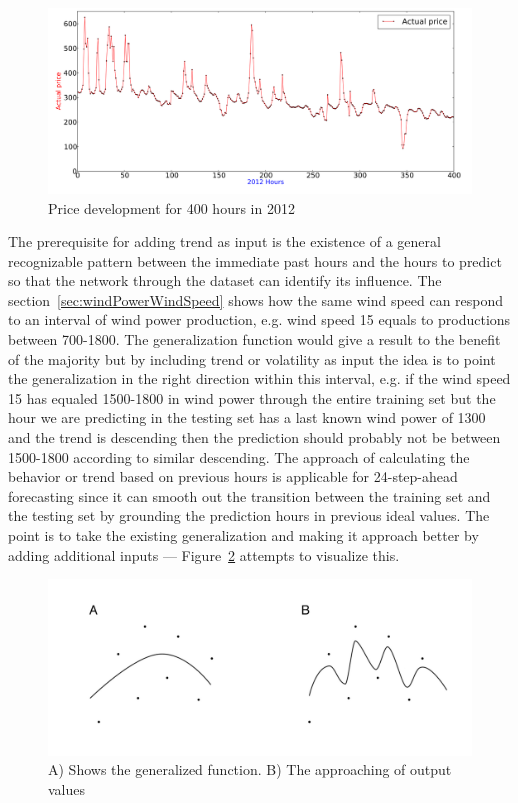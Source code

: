 \begin{figure}[H]
\centering
\includegraphics[width=0.99\linewidth,natwidth=898,natheight=587]{billeder/priceGraph400.png}
\caption{Price development for 400 hours in 2012}
\label{fig:priceHourDevelopment400HoursStatistics}
\end{figure}

The prerequisite for adding trend as input is the existence of a general recognizable pattern between the immediate past hours and the hours to predict so that the network through the dataset can identify its influence. The section~\ref{sec:windPowerWindSpeed} shows how the same wind speed can respond to an interval of wind power production, e.g. wind speed 15 equals to productions between 700-1800. The generalization function would give a result to the benefit of the majority but by including trend or volatility as input the idea is to point the generalization in the right direction within this interval, e.g. if the wind speed 15 has equaled 1500-1800 in wind power through the entire training set but the hour we are predicting in the testing set has a last known wind power of 1300 and the trend is descending then the prediction should probably not be between 1500-1800 according to similar descending. The approach of calculating the behavior or trend based on previous hours is applicable for 24-step-ahead forecasting since it can smooth out the transition between the training set and the testing set by grounding the prediction hours in previous ideal values. The point is to take the existing generalization and making it approach better by adding additional inputs --- Figure~\ref{fig:WP} attempts to visualize this. 

\begin{figure}[H]
\centering
\includegraphics[width=0.99\linewidth,natwidth=898,natheight=587]{billeder/WP_000057.jpg}
\caption{A) Shows the generalized function. B) The approaching of output values}
\label{fig:WP}
\end{figure}

